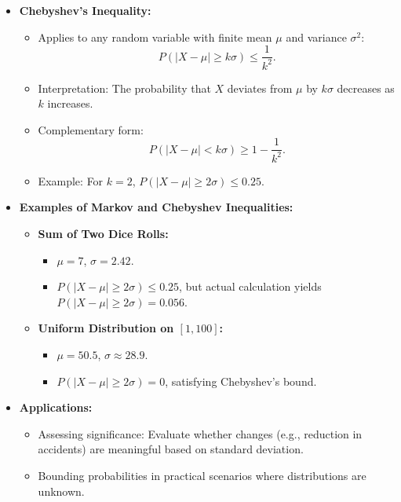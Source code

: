 \documentclass{article}
\begin{document}
\begin{itemize}
  \item \textbf{Chebyshev's Inequality:}
    \begin{itemize}
      \item Applies to any random variable with finite mean $\mu$ and variance $\sigma^2$:
        \[
          P(|X - \mu| \geq k\sigma) \leq \frac{1}{k^2}.
        \]
      \item Interpretation: The probability that $X$ deviates from $\mu$ by $k\sigma$ decreases as $k$ increases.
      \item Complementary form:
        \[
          P(|X - \mu| < k\sigma) \geq 1 - \frac{1}{k^2}.
        \]
      \item Example: For $k = 2$, $P(|X - \mu| \geq 2\sigma) \leq 0.25$.
    \end{itemize}

  \item \textbf{Examples of Markov and Chebyshev Inequalities:}
    \begin{itemize}
      \item \textbf{Sum of Two Dice Rolls:}
        \begin{itemize}
          \item $\mu = 7$, $\sigma = 2.42$.
          \item $P(|X - \mu| \geq 2\sigma) \leq 0.25$, but actual calculation yields $P(|X - \mu| \geq 2\sigma) = 0.056$.
        \end{itemize}
      \item \textbf{Uniform Distribution on $[1, 100]$:}
        \begin{itemize}
          \item $\mu = 50.5$, $\sigma \approx 28.9$.
          \item $P(|X - \mu| \geq 2\sigma) = 0$, satisfying Chebyshev's bound.
        \end{itemize}
    \end{itemize}

  \item \textbf{Applications:}
    \begin{itemize}
      \item Assessing significance: Evaluate whether changes (e.g., reduction in accidents) are meaningful based on standard deviation.
      \item Bounding probabilities in practical scenarios where distributions are unknown.
    \end{itemize}
\end{itemize}
\end{document}
